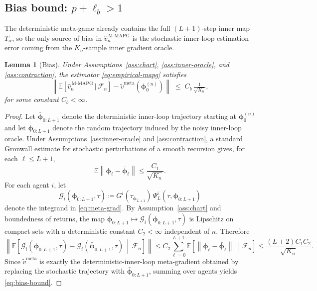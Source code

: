 \documentclass[11pt]{article}
\newtheorem{lemma}[theorem]{Lemma}
\theoremstyle{definition}
\newcommand{\E}{\mathbb{E}}
\newcommand{\norm}[1]{\left\lVert #1 \right\rVert}
\newcommand{\calF}{\mathcal{F}}
\newcommand{\meta}{\mathrm{meta}}
\newcommand{\MAPG}{\mathrm{M\text{-}MAPG}}
\begin{document}
\subsection{Bias bound: $p+\ell_b>1$}

The deterministic meta-game already contains the full $(L+1)$-step inner map $T_\alpha$, so the only source of bias in $\hat v_n^{\,\MAPG}$ is the stochastic inner-loop estimation error coming from the $K_n$-sample inner gradient oracle.

\begin{lemma}[Bias]\label{lem:bias}
Under Assumptions~\ref{ass:chart}, \ref{ass:inner-oracle}, and \ref{ass:contraction}, the estimator \eqref{eq:empirical-mapg} satisfies
\begin{equation}\label{eq:bias-bound}
\norm{\E\!\left[\hat v_n^{\,\MAPG}\,\big|\,\calF_n\right]-\widetilde v^\meta(\bm\phi_0^{(n)})}
\;\le\;
C_b\,\tfrac{1}{\sqrt{K_n}},
\end{equation}
for some constant $C_b<\infty$.
\end{lemma}

\begin{proof}
Let $\bar{\bm\phi}_{0:L+1}$ denote the deterministic inner-loop trajectory starting at $\bm\phi_0^{(n)}$ and let $\bm\phi_{0:L+1}$ denote the random trajectory induced by the noisy inner-loop oracle. Under Assumptions~\ref{ass:inner-oracle} and \ref{ass:contraction}, a standard Gronwall estimate for stochastic perturbations of a smooth recursion gives, for each $\ell\le L+1$,
\begin{equation*}
\E\norm{\bm\phi_\ell-\bar{\bm\phi}_\ell}\le \frac{C_1}{\sqrt{K_n}}.
\end{equation*}
For each agent $i$, let
\[
\mathcal G_i(\bm\phi_{0:L+1},\tau)
\coloneqq
G^i(\tau_{\bm\phi_{L+1}})\,\Psi_L^i(\tau,\bm\phi_{0:L+1})
\]
denote the integrand in \eqref{eq:meta-grad}. By Assumption~\ref{ass:chart} and boundedness of returns, the map $\bm\phi_{0:L+1}\mapsto \mathcal G_i(\bm\phi_{0:L+1},\tau)$ is Lipschitz on compact sets with a deterministic constant $C_2<\infty$ independent of $n$. Therefore
\[
\left\|
\E\!\left[\mathcal G_i(\bm\phi_{0:L+1},\tau)-\mathcal G_i(\bar{\bm\phi}_{0:L+1},\tau)\,\middle|\,\calF_n\right]
\right\|
\le
C_2\sum_{\ell=0}^{L+1}\E\!\left[\norm{\bm\phi_\ell-\bar{\bm\phi}_\ell}\,\middle|\,\calF_n\right]
\le
\frac{(L+2)C_1C_2}{\sqrt{K_n}}.
\]
Since $\widetilde v^\meta$ is exactly the deterministic-inner-loop meta-gradient obtained by replacing the stochastic trajectory with $\bar{\bm\phi}_{0:L+1}$, summing over agents yields \eqref{eq:bias-bound}.
\end{proof}
\end{document}
